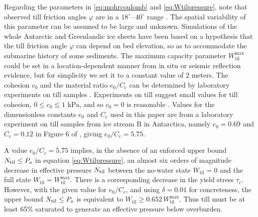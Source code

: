 \documentclass[gmd]{copernicus}   %
\newcommand{\text}{\textrm}
\newcommand{\Wtil}{W_{\text{til}}}
\newcommand{\Wtilmax}{W_{\text{til}}^{\text{max}}}
\begin{document}
Regarding the parameters in \eqref{eq:mohrcoulomb} and \eqref{eq:Wtilpressure}, note that observed till friction angles $\varphi$ are in a $18^\circ$--\,$40^\circ$ range \citep{CuffeyPaterson}.  The spatial variability of this parameter can be assumed to be large and unknown.  Simulations of the whole Antarctic \citep{Martinetal2011} and Greenlandic \citep{AschwandenAdalgeirsdottirKhroulev} ice sheets have been based on a hypothesis that the till friction angle $\varphi$ can depend on bed elevation, so as to accommodate the submarine history of some sediments.  The maximum capacity parameter $\Wtilmax$ could be set in a location-dependent manner from in situ \citep{Tulaczyketal2000} or seismic reflection \citep{TrufferHarrisonEchelmeyer2000} evidence, but for simplicity we set it to a constant value of $2$ meters.  The cohesion $c_0$ and the material ratio $e_0/C_c$ can be determined by laboratory experiments on till samples \citep[e.g.][]{Hookeetal1997,Tulaczyketal2000}.  Experiments on till suggest small values for till cohesion, $0 \le c_0 \lesssim 1$ kPa, and so $c_0=0$ is reasonable \citep{Tulaczyketal2000}.  Values for the dimensionless constants $e_0$ and $C_c$ used in this paper are from a laboratory experiment on till samples from ice stream B in Antarctica, namely $e_0=0.69$ and $C_c=0.12$ in Figure 6 of \cite{Tulaczyketal2000}, giving $e_0/C_c=5.75$.

A value $e_0/C_c=5.75$ implies, in the absence of an enforced upper bound $\Ntil \le P_o$ in equation \eqref{eq:Wtilpressure}, an almost six orders of magnitude decrease in effective pressure $\Ntil$ between the no-water state $\Wtil=0$ and the full state $\Wtil=\Wtilmax$.  There is a corresponding decrease in the yield stress $\tau_c$.  However, with the given value for $e_0/C_c$, and using $\delta = 0.01$ for concreteness, the upper bound $\Ntil \le P_o$ is equivalent to $\Wtil \ge 0.652\, \Wtilmax$.  Thus till must be at least 65\% saturated to generate an effective pressure below overburden.
\end{document}
